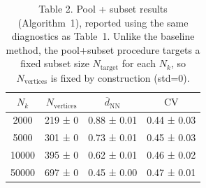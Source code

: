 
\begin{table}[htbp]
\centering
\caption{Table 2. Pool + subset results (Algorithm~1), reported using the same diagnostics as Table~1. Unlike the baseline method, the pool+subset procedure targets a fixed subset size $N_{\text{target}}$ for each $N_k$, so $N_{\text{vertices}}$ is fixed by construction (std=0).}
\label{tab:pool_subset_nk_sweep}
\vspace{1.75em}
\begin{tabular*}{\columnwidth}{@{\extracolsep{\fill}}cccc@{}}
\toprule
$N_k$ & $N_{\text{vertices}}$ & $\overline{d}_{\text{NN}}$ & $\mathrm{CV}$ \\
\midrule
2000 & 219 ± 0 & 0.88 ± 0.01 & 0.44 ± 0.03 \\
5000 & 301 ± 0 & 0.73 ± 0.01 & 0.45 ± 0.03 \\
10000 & 395 ± 0 & 0.62 ± 0.01 & 0.46 ± 0.02 \\
50000 & 697 ± 0 & 0.45 ± 0.00 & 0.47 ± 0.01 \\
\bottomrule
\end{tabular*}
\end{table}
